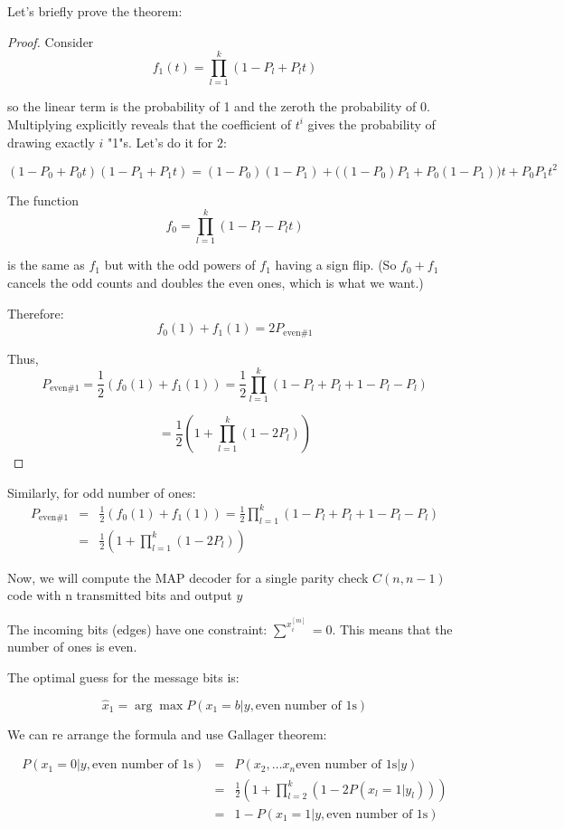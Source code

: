 Let's briefly prove the theorem: 

\begin{proof}[Proof]
	Consider
\[
  f_1(t) = \prod_{l=1}^{k}(1 - P_l + P_l t)
\]

so the linear term is the probability of 1 and the zeroth the probability of 0. Multiplying explicitly reveals that the coefficient of $t^i$ gives the probability of drawing exactly $i$ "1"s. Let's do it for $2$:

\[
(1 - P_0 + P_0 t)(1 - P_1 + P_1 t)
= (1 - P_0)(1 - P_1) + \bigl((1 - P_0)P_1 + P_0(1 - P_1)\bigr)t + P_0 P_1 t^2
\]


The function
\[
  f_0 = \prod_{l=1}^{k}(1 - P_l - P_l t)
\]

is the same as $f_1$ but with the odd powers of $f_1$ having a sign flip. (So $f_0 + f_1$ cancels the odd counts and doubles the even ones, which is what we want.)

Therefore:
\[
  f_0(1) + f_1(1) = 2P_{\text{even} \#1}
\]

Thus,
\[
  P_{\text{even} \#1} = \frac{1}{2}\left(f_0(1) + f_1(1)\right) = \frac{1}{2}\prod_{l=1}^{k}(1 - P_l + P_l + 1 - P_l - P_l)
\]

\[
= \frac{1}{2}\left(1 + \prod_{l=1}^{k}(1 - 2P_l)\right)
\]
\end{proof}

Similarly, for odd number of ones:
\begin{eqnarray}
	P_{\text{even} \#1} &=& \frac{1}{2}\left(f_0(1) + f_1(1)\right) = \frac{1}{2}\prod_{l=1}^{k}(1 - P_l + P_l + 1 - P_l - P_l) \nonumber \\
	&=& \frac{1}{2}\left(1 + \prod_{l=1}^{k}(1 - 2P_l)\right)
\end{eqnarray}

Now, we will compute the MAP decoder for a single parity check $C(n, n-1)$ code with n transmitted bits and output $y$

The incoming bits (edges) have one constraint: $\sum^{x^{[m]}_i} = 0$. This means that the number of ones is even.

The optimal guess for the message bits is:

\begin{equation}
	\hat{x}_1 = \arg \max P(x_1=b|y, \text{even number of 1s})
\end{equation}

We can re arrange the formula and use Gallager theorem:

\begin{eqnarray}
	P(x_1=0|y, \text{even number of 1s}) &=& P(x_2, \dots x_n  \text{even number of 1s}| y) \nonumber \\
	&=& \frac{1}{2}\left(1 + \prod_{l=2}^{k}(1 - 2P(x_l=1|y_l))\right) \nonumber \\
	&=& 1 - P(x_1=1|y, \text{even number of 1s})
\end{eqnarray}

